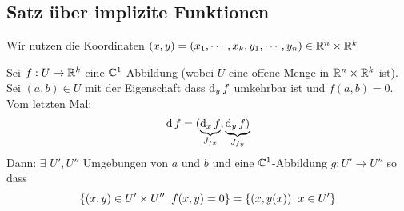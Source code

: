 \subsection{Satz über implizite Funktionen}
Wir nutzen die Koordinaten $(x,y) = (x_1,\cdots,x_k,y_1,\cdots,y_n)\in\mathbb{R}^n\times\mathbb{R}^k$
\begin{Sat}
  Sei $f:U\rightarrow\mathbb{R}^k$ eine $\mathbb{C}^1$ Abbildung (wobei $U$ eine offene Menge in $\mathbb{R}^n\times\mathbb{R}^k$ ist). Sei $(a,b)\in U$ mit der Eigenschaft dass $\operatorname{d}_y f$ umkehrbar ist und $f(a,b)=0$. Vom letzten Mal:
  \[\operatorname{d} f=(\underbrace{\operatorname{d}_x f}_{J_{fx}}, \underbrace{\operatorname{d}_y f)}_{J_{fy}}\]
  Dann: $\exists$ $U', U''$ Umgebungen von $a$ und $b$ und eine $\mathbb{C}^1$-Abbildung $g:U'\to U''$ so dass
  \[\left\{ (x,y)\in U'\times U''\hspace{2mm} f(x,y)=0 \right\}=\left\{ (x,y(x))\hspace{2mm} x\in U' \right\}\]
\end{Sat}
